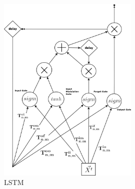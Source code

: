 \documentclass[draft,dvipsnames]{drexel-thesis}
\begin{document}
\begin{thesis}
\begin{enumerate}
\begin{figure}[t!]
    \centering
    \includegraphics[width=0.6\textwidth]{pictures/figures/LSTM.png}
    \caption{LSTM}
    \label{fig:LSTM}
\end{figure}





\end{enumerate}
\end{thesis}
\end{document}
